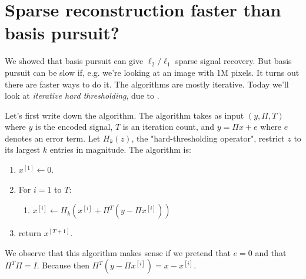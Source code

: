 \documentclass[11pt]{article}
\begin{document}
\section{Sparse reconstruction faster than basis pursuit?}
We showed that basis pursuit can give $\ell_2/\ell_1$ sparse signal recovery. But basis pursuit can be slow if, e.g. we're looking at an image with 1M pixels. It turns out there are faster ways to do it. The algorithms are mostly iterative. Today we'll look at {\em iterative hard thresholding}, due to \cite{BD09}.

Let's first write down the algorithm. The algorithm takes as input $(y, \Pi, T)$ where $y$ is the encoded signal, $T$ is an iteration count, and $y = \Pi x + e$ where $e$ denotes an error term. Let $H_k(z)$, the "hard-thresholding operator", restrict $z$ to its largest $k$ entries in magnitude. The algorithm is:
\begin{enumerate}
\item
$x^{[1]} \leftarrow 0$.
\item
For $i = 1$ to $T$:
	\begin{enumerate}
	\item $x^{[i]} \leftarrow H_k(x^{[i]} + \Pi^T(y - \Pi x^{[i]}))$
	\end{enumerate}
\item
return $x^{[T+1]}$.
\end{enumerate}
We observe that this algorithm makes sense if we pretend that $e= 0$ and that $\Pi^T \Pi =I$. Because then $\Pi^T(y - \Pi x^{[i]}) = x - x^{[i]}$.
\end{document}
